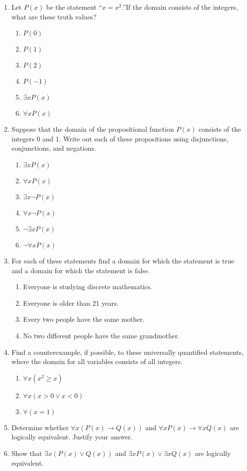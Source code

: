 \documentclass{sig-alternate-05-2015}
\begin{document}
\begin{enumerate}
\item Let $P(x)$ be the statement \textquotedblleft $x = x^2$.\textquotedblright If the domain consists
of the integers, what are these truth values?
\begin{enumerate}
	\item $P(0)$
	\item $P(1)$
	\item $P(2)$
	\item $P(-1)$
	\item $\exists x P(x)$
	\item $\forall x P(x)$
\end{enumerate}

\item Suppose that the domain of the propositional function
$P(x)$ consists of the integers 0 and 1. Write out
each of these propositions using disjunctions, conjunctions,
and negations.
\begin{enumerate}
	\item $\exists x P(x)$
	\item $\forall x P(x)$
	\item $\exists x \neg P(x)$
	\item $\forall x \neg P(x)$
	\item $\neg \exists x P(x)$
	\item $\neg \forall x P(x)$
\end{enumerate}

\item For each of these statements find a domain for which the
statement is true and a domain for which the statement is
false.
\begin{enumerate}
	\item Everyone is studying discrete mathematics.
	\item Everyone is older than 21 years.
	\item Every two people have the same mother.
	\item No two different people have the same grandmother.
\end{enumerate}

\item Find a counterexample, if possible, to these universally
quantified statements, where the domain for all variables
consists of all integers.
\begin{enumerate}
	\item $\forall x (x^2 \ge x)$
	\item $\forall x (x > 0 \vee x < 0)$
	\item $\forall (x = 1)$
\end{enumerate}

\item Determine whether $\forall x (P(x) \rightarrow Q(x))$ and $\forall x P(x) \rightarrow
\forall x Q(x)$ are logically equivalent. Justify your answer.

\item Show that $\exists x (P(x) \vee Q(x))$ and $\exists x P(x) \vee \exists x Q(x)$ are
logically equivalent.

\end{enumerate}
\end{document}
